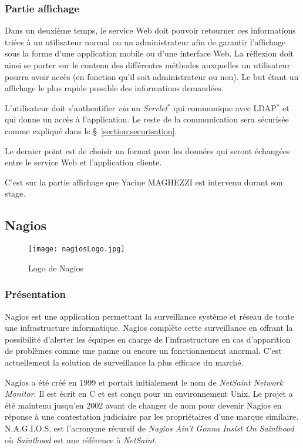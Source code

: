 \subsubsection{Partie affichage}

Dans un deuxi\`eme temps, le service Web doit pouvoir retourner ces informations tri\'ees \`a un utilisateur normal ou un administrateur afin de garantir l'affichage sous la forme d'une application mobile ou d'une interface Web.
La r\'eflexion doit ainsi se porter sur le contenu des diff\'erentes m\'ethodes auxquelles un utilisateur pourra avoir acc\`es (en fonction qu'il soit administrateur ou non).
Le but \'etant un affichage le plus rapide possible des informations demand\'ees.

L'utilisateur doit s'authentifier \textit{via} un \textit{Servlet}$^*$ qui communique avec LDAP$^*$ et qui donne un acc\`es \`a l'application.
Le reste de la communication sera s\'ecuris\'ee comme expliqu\'e dans le \S~\ref{section:securisation}.

Le dernier point est de choisir un format pour les donn\'ees qui seront \'echang\'ees entre le service Web et l'application cliente.

C'est sur la partie affichage que Yacine MAGHEZZI est intervenu durant son stage.

\subsection{Nagios}
\label{section:nagios}

\begin{figure}[!ht]
	\centering
	\texttt{[image: nagiosLogo.jpg]}
	\caption{Logo de Nagios}

\end{figure}

\subsubsection{Pr\'esentation}

Nagios est une application permettant la surveillance syst\`eme et r\'eseau de toute une infrastructure informatique.
Nagios compl\`ete cette surveillance en offrant la possibilit\'e d'alerter les \'equipes en charge de l'infrastructure en cas d'apparition de probl\`emes comme une panne ou encore un fonctionnement anormal.
C'est actuellement la solution de surveillance la plus efficace du march\'e.

Nagios a \'et\'e cr\'e\'e en 1999 et portait initialement le nom de \textit{NetSaint Network Monitor}.
Il est \'ecrit en C et est con\c{c}u pour un environnement Unix.
Le projet a \'et\'e maintenu jusqu'en 2002 avant de changer de nom pour devenir Nagios en r\'eponse \`a une contestation judiciaire par les propri\'etaires d'une marque similaire.
N.A.G.I.O.S. est l'acronyme r\'ecursif de \og{}\textit{Nagios Ain't Gonna Insist On Sainthood}\fg{} o\`u \textit{Sainthood} est une r\'ef\'erence \`a \textit{NetSaint}.


